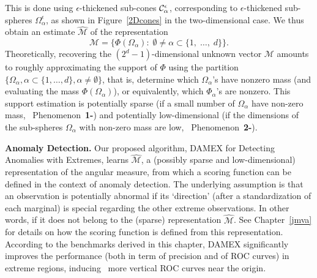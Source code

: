 This is done using $\epsilon$-thickened sub-cones $\mathcal{C}_\alpha^\epsilon$, corresponding to $\epsilon$-thickened sub-spheres $\Omega_\alpha^\epsilon$, as shown in Figure~\ref{2Dcones} in the two-dimensional case.
We thus obtain an estimate $\widehat{\mathcal{M}}$ of the representation
$$\mathcal{M} = \{ \Phi(\Omega_{\alpha}):\; \emptyset \neq \alpha\subset\{1,\; \ldots,\; d \}\}.$$
Theoretically, recovering the $(2^{d}-1)$-dimensional unknown
vector $\mathcal{M}$ amounts to roughly approximating the support of $\Phi$ using the partition
$\{\Omega_\alpha, \alpha\subset\{1,\ldots,d\}, \alpha\neq \emptyset\}$, that is, determine which $\Omega_\alpha$'s have
nonzero mass (and evaluating the mass $\Phi(\Omega_\alpha)$), or equivalently, which $\Phi_\alpha$'s are nonzero. This support estimation is potentially
sparse (if a small number of $\Omega_\alpha$ have non-zero mass, \ie~Phenomenon~\textbf{1-}) and
potentially low-dimensional (if the dimensions of the sub-spheres $\Omega_\alpha$ with non-zero mass are low, \ie~Phenomenon~\textbf{2-}).



\textbf{Anomaly Detection.}
Our proposed algorithm, DAMEX for Detecting Anomalies with Extremes, learns $\widehat{\mathcal{M}}$, a (possibly sparse and low-dimensional) representation of the angular measure, from which a scoring function can be defined in the context of anomaly detection.
The underlying assumption is that an observation is potentially abnormal if its `direction' (after a standardization of each marginal) is special regarding the other extreme observations. In other words, if it does not belong to the (sparse) representation $\widehat{\mathcal{M}}$. See Chapter~\ref{jmva} for details on how the scoring function is defined from this representation.
According to the benchmarks derived in this chapter, DAMEX significantly improves the performance (both in term of precision and of ROC curves) in extreme regions, inducing \eg~more vertical ROC curves near the origin.

